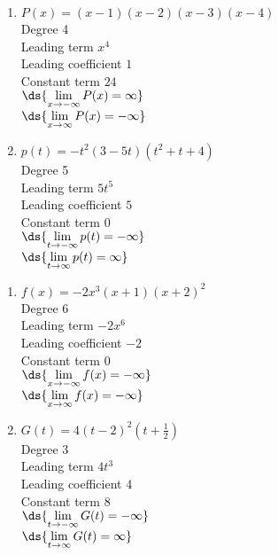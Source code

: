 \documentclass{ximera}
\begin{document}
\begin{multicols}{2}
\begin{enumerate}
\setcounter{enumi}{\value{HW}}


\item $P(x) = (x - 1)(x - 2)(x - 3)(x - 4)$\\
Degree 4 \\
Leading term $x^{4}$\\
Leading coefficient $1$\\
Constant term $24$\\
$\ds{\lim_{x \rightarrow - \infty} P(x)  = \infty}$ \\
$\ds{\lim_{x \rightarrow  \infty} P(x)  = -\infty}$ \\


\item $p(t) = -t^2(3 - 5t)(t^{2} + t + 4)$\\
Degree 5 \\
Leading term $5t^{5}$\\
Leading coefficient $5$\\
Constant term $0$\\
$\ds{\lim_{t \rightarrow - \infty} p(t)  = -\infty}$ \\
$\ds{\lim_{t \rightarrow  \infty} p(t)  = \infty}$ \\

\setcounter{HW}{\value{enumi}}
\end{enumerate}
\end{multicols}



\begin{multicols}{2}
\begin{enumerate}
\setcounter{enumi}{\value{HW}}

\item $f(x) = -2x^3(x+1)(x+2)^2$ \\
Degree 6 \\
Leading term $-2x^{6}$\\
Leading coefficient $-2$\\
Constant term $0$\\
$\ds{\lim_{x \rightarrow - \infty} f(x)  = -\infty}$ \\
$\ds{\lim_{x \rightarrow  \infty} f(x)  = -\infty}$ \\

\item $G(t) = 4(t-2)^2\left(t+\frac{1}{2}\right)$ \\
Degree 3 \\
Leading term $4t^3$\\
Leading coefficient $4$\\
Constant term $8$\\
$\ds{\lim_{t \rightarrow - \infty} G(t)  = -\infty}$ \\
$\ds{\lim_{t \rightarrow  \infty} G(t)  = \infty}$ \\


\setcounter{HW}{\value{enumi}}
\end{enumerate}
\end{multicols}
\end{document}
